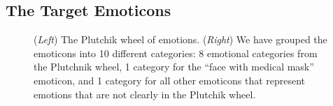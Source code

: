 \documentclass[11pt]{article}
\newcommand{\fixme}[1]{}
\begin{document}

\subsection{The Target Emoticons}

\begin{figure}
    \centering
    \label{fig:plu_wheel}
    \caption{
        (\emph{Left}) 
        The Plutchik wheel of emotions.
        (\emph{Right}) 
        We have grouped the emoticons into 10 different categories:
        8 emotional categories from the Plutchnik wheel,
        1 category for the ``face with medical mask'' emoticon,
        and 1 category for all other emoticons that represent emotions that are not clearly in the Plutchik wheel.
    }
    \label{fig:Mapped_emojis}%
\end{figure}
\end{document}
